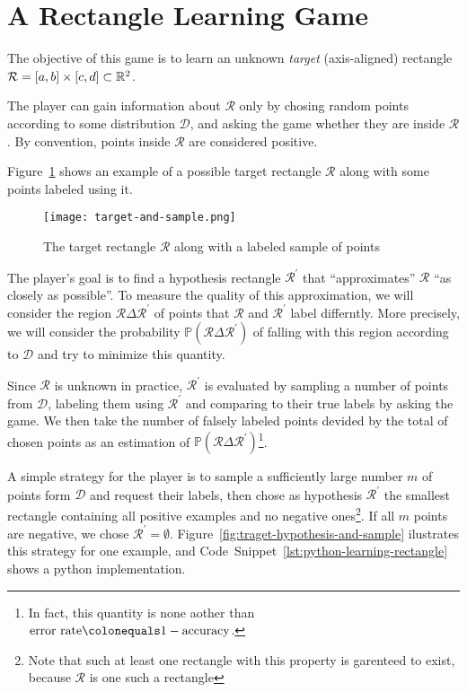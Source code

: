 \section{A Rectangle Learning Game}
\newcommand{\rectangle}{\mathcal{R}}
The objective of this game is to learn an unknown \emph{target} (axis-aligned) rectangle \(\rectangle = [a, b] \times [c, d] \subset \reals^2\).

The player can gain information about \(\rectangle\) only by chosing random points according to some distribution \(\mathcal{D}\), and asking the game whether they are inside \(\rectangle\). By convention, points inside \(\rectangle\) are considered positive.

Figure~\ref{fig:traget-and-sample} shows an example of a possible target rectangle \(\rectangle\) along with some points labeled using it.

\begin{figure}
    \begin{center}
        \texttt{[image: target-and-sample.png]}  
    \end{center}
    \caption{The target rectangle \(\rectangle\) along with a labeled sample of points}
    \label{fig:traget-and-sample}
\end{figure}

The player's goal is to find a hypothesis rectangle \(\rectangle^\prime\) that ``approximates'' \(\rectangle\) ``as closely as possible''. To measure the quality of this approximation, we will consider the region \(\rectangle\Delta\rectangle^\prime\) of points that \(\rectangle\) and \(\rectangle^\prime\) label differntly. More precisely, we will consider the probability \(\mathbb{P}(\rectangle\Delta\rectangle^\prime)\) of falling with this region according to \(\mathcal{D}\) and try to minimize this quantity.

Since \(\rectangle\) is unknown in practice, \(\rectangle^\prime\) is evaluated by sampling a number of points from \(\mathcal{D}\), labeling them using \(\rectangle^\prime\) and comparing to their true labels by asking the game. We then take the number of falsely labeled points devided by the total of chosen points as an estimation of \(\mathbb{P}(\rectangle\Delta\rectangle^\prime)\)\footnote{In fact, this quantity is none aother than \(\mathrm{error\ rate} \colonequals 1 - \mathrm{accuracy}\).}.

A simple strategy for the player is to sample a sufficiently large number \(m\) of points form \(\mathcal{D}\) and request their labels, then chose as hypothesis \(\rectangle^\prime\) the smallest rectangle containing all positive examples and no negative ones\footnote{Note that such at least one rectangle with this property is garenteed to exist, because \(\rectangle\) is one such a rectangle}. If all \(m\) points are negative, we chose \(\rectangle^\prime = \emptyset\). Figure~\ref{fig:traget-hypothesis-and-sample} ilustrates this strategy for one example, and Code~Snippet~\ref{lst:python-learning-rectangle} shows a python implementation.


